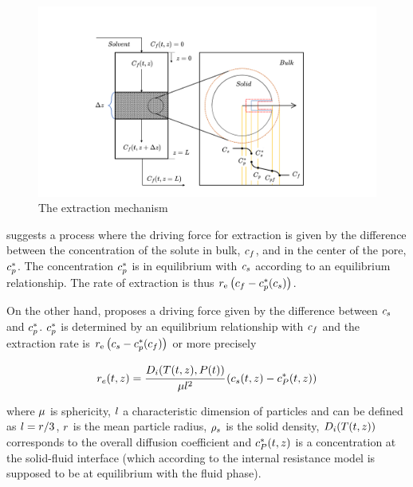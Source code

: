 \documentclass[../Article_Sensitivity_Analsysis.tex]{subfiles}
\begin{document}
		\begin{figure}[h!]
			\centering
			\includegraphics[trim = 45cm 0cm 60cm 20cm,clip,width=\columnwidth]{Figures/SFE_PFD.drawio.png}	
			\caption{The extraction mechanism}
			\label{fig: SFE_Mechanism}
		\end{figure}
			
		\citet{Bulley1984} suggests a process where the driving force for extraction is given by the difference between the concentration of the solute in bulk, ${\color{black}c_f}$, and in the center of the pore, ${\color{black}c_p^*}$. The concentration ${\color{black}c_p^*}$ is in equilibrium with ${\color{black}c_s}$ according to an equilibrium relationship. The rate of extraction is thus ${\color{black}r_\text{e}}\left({\color{black}c_f} - {\color{black}c^*_p}({\color{black}c_s})\right)$.  
			
		On the other hand, \citet{Reverchon1996} proposes a driving force given by the difference between ${\color{black}c_s}$ and ${\color{black}c_p^*}$. ${\color{black}c_p^*}$ is determined by an equilibrium relationship with ${\color{black}c_f}$ and the extraction rate is ${\color{black}r_\text{e}}\left({\color{black}c_s} - {\color{black}c^*_p}({\color{black}c_f})\right)$ or more precisely
			
			{\footnotesize
				\begin{equation} \label{Model_kinetic_basic}
					{\color{black}r_e}(t,z) = \cfrac{{\color{black}D_i}({\color{black}T}(t,z), {\color{black}P}(t))}{{\color{black} \mu l^2} }\left({\color{black}c_s}(t,z) - {\color{black}c_P^*}(t,z) \right)
			\end{equation} }
			
		where ${\color{black}\mu}$ is sphericity, ${\color{black}l}$ a characteristic dimension of particles and can be defined as ${\color{black}l} = {\color{black}r}/3$, ${\color{black}r}$ is the mean particle radius, ${\color{black}\rho_s}$ is the solid density, ${\color{black}D_i}({\color{black}T}(t,z))$ corresponds to the overall diffusion coefficient and ${\color{black}c_P^*}(t,z)$ is a concentration at the solid-fluid interface (which according to the internal resistance model is supposed to be at equilibrium with the fluid phase). 
			
\end{document}
